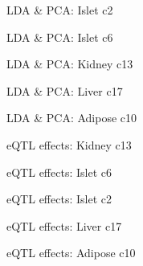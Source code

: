 \documentclass[12pt,t]{beamer}
\begin{document}
\begin{frame}[c]{LDA \& PCA: Islet c2}
\end{frame}

\begin{frame}[c]{LDA \& PCA: Islet c6}
\end{frame}

\begin{frame}[c]{LDA \& PCA: Kidney c13}
\end{frame}

\begin{frame}[c]{LDA \& PCA: Liver c17}
\end{frame}

\begin{frame}[c]{LDA \& PCA: Adipose c10}
\end{frame}



\begin{frame}[c]{eQTL effects: Kidney c13}
\end{frame}

\begin{frame}[c]{eQTL effects: Islet c6}
\end{frame}

\begin{frame}[c]{eQTL effects: Islet c2}
\end{frame}

\begin{frame}[c]{eQTL effects: Liver c17}
\end{frame}

\begin{frame}[c]{eQTL effects: Adipose c10}
\end{frame}
\end{document}
